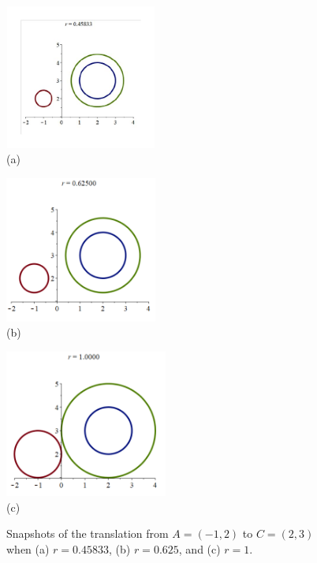 \documentclass[12pt,a4paper]{article}%
\begin{document}
\begin{figure}[htpb]
\begin{center}
\parbox[b]{1.9in}{\begin{center}
\includegraphics[natheight=2.792200in,natwidth=2.941200in,height=1.8707in,width=1.9691in]{PJH75H19.pdf}
 \\ (a)
\end{center}}
\qquad
\parbox[b]{1.9in}{\begin{center}
\includegraphics[natheight=2.756700in,natwidth=2.870300in,height=1.8946in,width=1.9718in]{PJH75H1A.pdf}
 \\ (b)
\end{center}}
\qquad
\parbox[b]{1.9in}{\begin{center}
\includegraphics[natheight=2.706200in,natwidth=2.991800in,height=1.9079in,width=2.1066in]{PJH75H1B.pdf}
 \\ (c)
\end{center}}
\end{center}
\caption{Snapshots of the translation from $A=(-1,2)$ to $C=(2,3)$ when (a) $r=0.45833$, (b) $r=0.625$, and (c) $r=1$.}
\label{fig6}
\end{figure}
\end{document}
